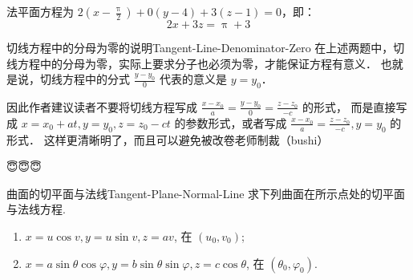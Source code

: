 \begin{solution}
    法平面方程为 $2\left(x - \frac{\uppi}{2}\right) + 0(y - 4) + 3(z - 1) = 0$，即：
    \begin{equation}
        \boxed{2x + 3z = \uppi + 3}
    \end{equation}
\end{solution}

\begin{note}{切线方程中的分母为零的说明}{Tangent-Line-Denominator-Zero}
    在上述两题中，切线方程中的分母为零，实际上要求分子也必须为零，才能保证方程有意义．
    也就是说，切线方程中的分式 $\frac{y - y_0}{0}$ 代表的意义是 $y = y_0$．

    {\kaishu
        因此作者建议读者不要将切线方程写成 $\frac{x - x_0}{a} = \frac{y - y_0}{0} = \frac{z - z_0}{-c}$ 的形式，
        而是直接写成 $x = x_0 + a t, y = y_0, z = z_0 - c t$ 的参数形式，或者写成 $\frac{x - x_0}{a} = \frac{z - z_0}{-c}, y = y_0$ 的形式．
        这样更清晰明了，而且可以避免被改卷老师制裁（bushi）
    }{\emojifont 🤪}

    {\emojifont 😇😇😇}

\end{note}

\begin{problem}{曲面的切平面与法线}{Tangent-Plane-Normal-Line}
    求下列曲面在所示点处的切平面与法线方程.
    \begin{enumerate}
        \item $x = u \cos v, y = u \sin v, z = av$, 在 $(u_0, v_0)$;
        \item $x = a \sin \theta \cos \varphi, y = b \sin \theta \sin \varphi, z = c \cos \theta$, 在 $(\theta_0, \varphi_0)$.
    \end{enumerate}
\end{problem}

